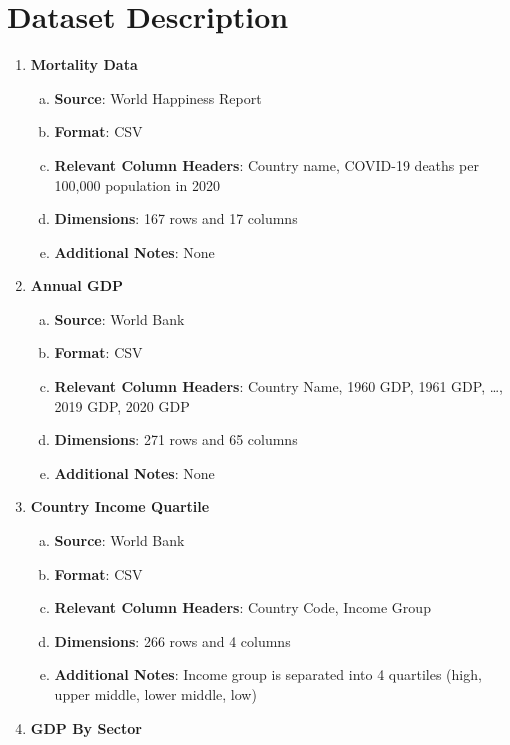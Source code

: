 \documentclass[fontsize=11pt]{article}
\begin{document}
\section*{Dataset Description}
\begin{enumerate}
    \item \textbf{Mortality Data}
        \begin{enumerate}[(a)]
            \item \textbf{Source}: World Happiness Report
            \item \textbf{Format}: CSV
            \item \textbf{Relevant Column Headers}: Country name, COVID-19 deaths per 100,000 population in 2020
            \item \textbf{Dimensions}: 167 rows and 17 columns
            \item \textbf{Additional Notes}: None
        \end{enumerate}
    \item \textbf{Annual GDP}
        \begin{enumerate}[(a)]
            \item \textbf{Source}: World Bank
            \item \textbf{Format}: CSV
            \item \textbf{Relevant Column Headers}: Country Name, 1960 GDP, 1961 GDP, …, 2019 GDP, 2020 GDP
            \item \textbf{Dimensions}: 271 rows and 65 columns
            \item \textbf{Additional Notes}: None
        \end{enumerate}
    \item \textbf{Country Income Quartile}
        \begin{enumerate}[(a)]
            \item \textbf{Source}: World Bank
            \item \textbf{Format}: CSV
            \item \textbf{Relevant Column Headers}: Country Code, Income Group
            \item \textbf{Dimensions}: 266 rows and 4 columns
            \item \textbf{Additional Notes}: Income group is separated into 4 quartiles (high, upper middle, lower middle, low)
        \end{enumerate}
    \item \textbf{GDP By Sector}
        \begin{enumerate}[(a)]

\end{enumerate}
\end{enumerate}
\end{document}

